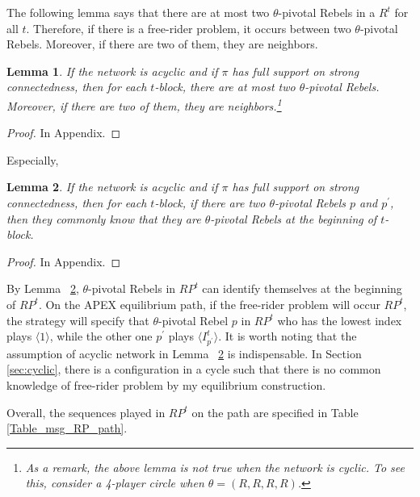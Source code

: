 \documentclass[12pt,letter]{article}
\newtheorem{lemma}{Lemma}[section]
\theoremstyle{definition}
\theoremstyle{remark}
\theoremstyle{claim}
\begin{document}
The following lemma says that there are at most two $\theta$-pivotal Rebels in a $R^{t}$ for all $t$. Therefore, if there is a free-rider problem, it occurs between two $\theta$-pivotal Rebels. Moreover, if there are two of them, they are neighbors.
\begin{lemma}
\label{lemma_at_most_two_nodes}
If the network is acyclic and if $\pi$ has full support on strong connectedness, then for each $t$-block, there are at most two $\theta$-pivotal Rebels. Moreover, if there are two of them, they are neighbors.\footnote{As a remark, the above lemma is not true when the network is cyclic. To see this, consider a 4-player circle when $\theta=(R,R,R,R)$.}
\end{lemma}
\begin{proof}
In Appendix.
\end{proof}

Especially,

\begin{lemma}
\label{lemman_pivotals_CK}
If the network is acyclic and if $\pi$ has full support on strong connectedness, then for each $t$-block, if there are two $\theta$-pivotal Rebels $p$ and $p^{'}$, then they commonly know that they are $\theta$-pivotal Rebels at the beginning of $t$-block.
\end{lemma}
\begin{proof}
In Appendix.
\end{proof}

By Lemma ~\ref{lemman_pivotals_CK}, $\theta$-pivotal Rebels in $RP^t$ can identify themselves at the beginning of $RP^t$. On the APEX equilibrium path, if the free-rider problem will occur $RP^t$, the strategy will specify that $\theta$-pivotal Rebel $p$ in $RP^{t}$ who has the lowest index plays $\langle 1 \rangle$, while the other one $p^{'}$ plays $\langle I^t_{p^{'}} \rangle$. It is worth noting that the assumption of acyclic network in Lemma ~\ref{lemman_pivotals_CK} is indispensable. In Section \ref{sec:cyclic}, there is a configuration in a cycle such that there is no common knowledge of free-rider problem by my equilibrium construction. 

Overall, the sequences played in $RP^t$ on the path are specified in Table \ref{Table_msg_RP_path}.
\end{document}
